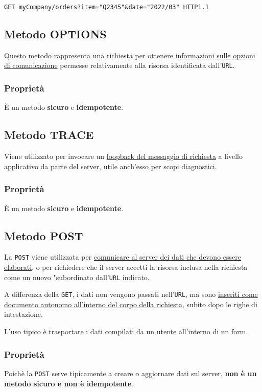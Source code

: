 \begin{tcolorbox}[title=Esempio di GET]
    \texttt{GET myCompany/orders?item="Q2345"\&date="2022/03" HTTP1.1}
\end{tcolorbox}

\subsection{Metodo OPTIONS}
Questo metodo rappresenta una richiesta per ottenere \uline{informazioni sulle opzioni di comunicazione} permesse relativamente alla risorsa identificata dall'\texttt{URL}.

\subsubsection{Proprietà}
È un metodo \textbf{sicuro} e \textbf{idempotente}.

\subsection{Metodo TRACE}
Viene utilizzato per invocare un \uline{loopback del messaggio di richiesta} a livello applicativo da parte del server, utile anch'esso per scopi diagnostici.

\subsubsection{Proprietà}
È un metodo \textbf{sicuro} e \textbf{idempotente}.

\subsection{Metodo POST}
La \texttt{POST} viene utilizzata per \uline{comunicare al server dei dati che devono essere elaborati}, o per richiedere che il server accetti la risorsa inclusa nella richiesta come un nuovo "subordinato dall'\texttt{URL} indicato.

A differenza della \texttt{GET}, i dati non vengono passati nell'\texttt{URL}, ma sono \uline{inseriti come documento autonomo all'interno del corpo della richiesta}, subito dopo le righe di intestazione.

L'uso tipico è trasportare i dati compilati da un utente all'interno di un form.

\subsubsection{Proprietà}
Poichè la \texttt{POST} serve tipicamente a creare o aggiornare dati sul server, \textbf{non è un metodo sicuro e non è idempotente}.

